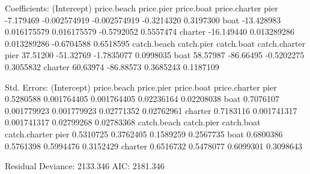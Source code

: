 \documentclass[a4paper,twoside]{tufte-book}\usepackage[]{graphicx}\usepackage[]{color}
\begin{document}
\begin{appendices}
\begin{Schunk}
\begin{Soutput}
Coefficients:
        (Intercept)  price.beach   price.pier price.boat price.charter
pier      -7.179469 -0.002574919 -0.002574919 -0.3214320     0.3197300
boat     -13.428983  0.016175579  0.016175579 -0.5792052     0.5557474
charter  -16.149440  0.013289286  0.013289286 -0.6704588     0.6518595
        catch.beach catch.pier catch.boat catch.charter
pier       37.51200  -51.32769 -1.7835077     0.0998035
boat       58.57987  -86.66495 -0.5202275     0.3055832
charter    60.63974  -86.88573  0.3685243     0.1187109

Std. Errors:
        (Intercept) price.beach  price.pier price.boat price.charter
pier      0.5280588 0.001764405 0.001764405 0.02236164    0.02208038
boat      0.7076107 0.001779923 0.001779923 0.02771352    0.02762961
charter   0.7183116 0.001741317 0.001741317 0.02799268    0.02783368
        catch.beach catch.pier catch.boat catch.charter
pier      0.5310725  0.3762405  0.1589259     0.2567735
boat      0.6800386  0.5761398  0.5994476     0.3152429
charter   0.6516732  0.5478077  0.6099301     0.3098643

Residual Deviance: 2133.346 
AIC: 2181.346 
\end{Soutput}
\end{Schunk}
\end{appendices}


 
\end{document}
